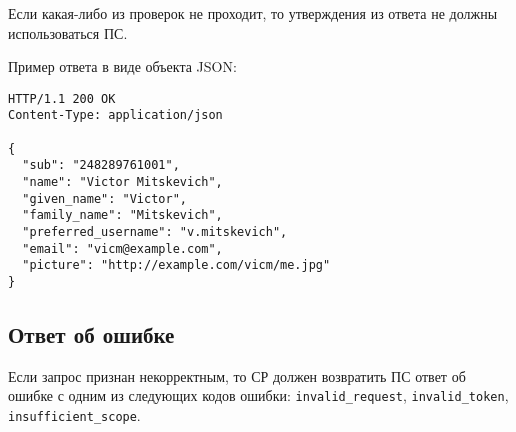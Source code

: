 Если какая-либо из проверок не проходит, то утверждения из ответа 
не должны использоваться ПС. 
 
Пример ответа в виде объекта JSON:
%
\begin{lstlisting}
HTTP/1.1 200 OK
Content-Type: application/json

{
  "sub": "248289761001",
  "name": "Victor Mitskevich",
  "given_name": "Victor",
  "family_name": "Mitskevich",
  "preferred_username": "v.mitskevich",
  "email": "vicm@example.com",
  "picture": "http://example.com/vicm/me.jpg"
}
\end{lstlisting}

\subsection{Ответ об ошибке}\label{REQRESP.UserInfo.Error}

Если запрос признан некорректным, то СР должен возвратить ПС 
ответ об ошибке с одним из следующих кодов ошибки: 
\lstinline{invalid_request},
\lstinline{invalid_token}, 
\lstinline{insufficient_scope}. 

